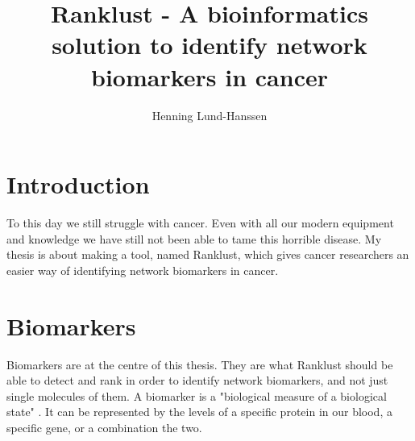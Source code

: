 \documentclass[UKenglish,11pt,a4paper]{article}
\title{Ranklust - A bioinformatics solution to identify network biomarkers in cancer}
\author{Henning Lund-Hanssen}
\begin{document}
\maketitle
\tableofcontents{}
\newpage
\section{Introduction}
To this day we still struggle with cancer. Even with all our modern equipment and knowledge we have still not been able
to tame this horrible disease. My thesis is about making a tool, named Ranklust, which gives cancer researchers an
easier way of identifying network biomarkers in cancer. 
\section{Biomarkers}
Biomarkers are at the centre of this thesis. They are what Ranklust should be able to detect and rank in order to
identify network biomarkers, and not just single molecules of them. A biomarker is a "biological measure of a biological
state" \cite{biomarker1}. It can be represented by the levels of a specific protein in our blood, a specific gene, or a
combination the two.
\end{document}

